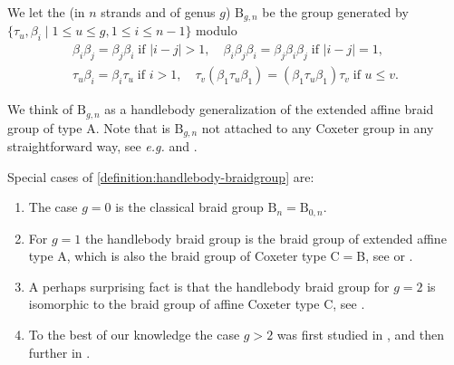 \documentclass[a4paper,11pt]{amsart}
\let\emph\relax
\newcommand{\eg}{\textsl{e.g.}}
\newcommand{\setstuff}[1]{\mathrm{#1}}
\numberwithin{equation}{section}
\let\fullref\autoref
\begin{document}
\begin{definition}\label{definition:handlebody-braidgroup}
We let the \emph{handlebody braid group} (in $n$ strands and of genus $g$)
$\setstuff{B}_{g,n}$ be the group generated by 
$\{\tau_{u},\beta_{i}\mid 1\leq u\leq g,1\leq i\leq n-1\}$ modulo
\begin{gather}
\label{eq:handlebody-summary1}
\beta_{i}\beta_{j}=\beta_{j}\beta_{i}\;\text{if }|i-j|>1,\quad
\beta_{i}\beta_{j}\beta_{i}=\beta_{j}\beta_{i}\beta_{j}\;\text{if }|i-j|=1,
\\ 
\label{eq:handlebody-summary2}
\tau_{u}\beta_{i}
=\beta_{i}\tau_{u}\;\text{if }i>1,
\quad
\tau_{v}(\beta_{1}\tau_{u}\beta_{1})
=(\beta_{1}\tau_{u}\beta_{1})\tau_{v}
\;\text{if }u\leq v.
\end{gather}
\end{definition}

We think of $\setstuff{B}_{g,n}$ as a 
handlebody generalization of the extended affine braid group of type A.
Note that is $\setstuff{B}_{g,n}$ not attached to any Coxeter group in any 
straightforward way, see {\eg} \cite[Remark 4]{La-handlebodies} 
and \cite[(1-7)]{RoTu-homflypt-typea}. 

\begin{remark}\label{remark:braidcox}
Special cases of \fullref{definition:handlebody-braidgroup} are:	
\begin{enumerate}

\setlength\itemsep{0.15cm}

\item The case $g=0$ is the classical braid group $\setstuff{B}_{n}=\setstuff{B}_{0,n}$.

\item For $g=1$ the handlebody braid group is the 
braid group of extended affine type A, which 
is also the braid group of Coxeter type C$=$B, 
see \cite{Brieskorn} or \cite{allcock}.

\item A perhaps surprising fact is that the handlebody braid group 
for $g=2$ is 
isomorphic to the braid group of affine Coxeter type C, 
see \cite{allcock}.

\item To the best of our knowledge the case $g>2$ was first 
studied in \cite{Ve-handlebodies}, 
and then further in \cite{HaOlLa-handlebodies}.

\end{enumerate}
\end{remark}
\end{document}
